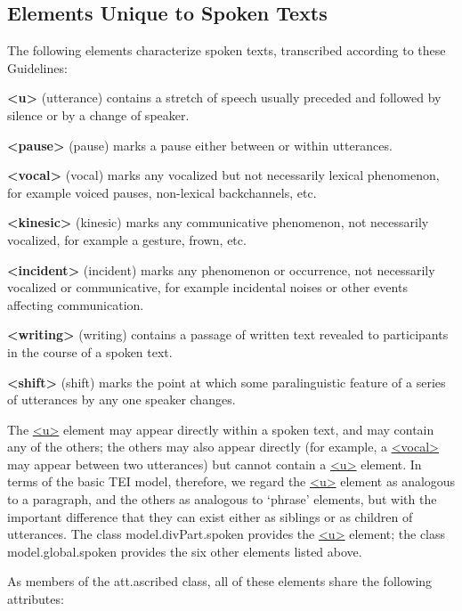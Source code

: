 \subsection[{Elements Unique to Spoken Texts}]{Elements Unique to Spoken Texts}\label{TSBA}\par
The following elements characterize spoken texts, transcribed according to these Guidelines: 
\begin{sansreflist}
  
\item [\textbf{<u>}] (utterance) contains a stretch of speech usually preceded and followed by silence or by a change of speaker.
\item [\textbf{<pause>}] (pause) marks a pause either between or within utterances.
\item [\textbf{<vocal>}] (vocal) marks any vocalized but not necessarily lexical phenomenon, for example voiced pauses, non-lexical backchannels, etc.
\item [\textbf{<kinesic>}] (kinesic) marks any communicative phenomenon, not necessarily vocalized, for example a gesture, frown, etc.
\item [\textbf{<incident>}] (incident) marks any phenomenon or occurrence, not necessarily vocalized or communicative, for example incidental noises or other events affecting communication.
\item [\textbf{<writing>}] (writing) contains a passage of written text revealed to participants in the course of a spoken text.
\item [\textbf{<shift>}] (shift) marks the point at which some paralinguistic feature of a series of utterances by any one speaker changes.
\end{sansreflist}
\par
The \hyperref[TEI.u]{<u>} element may appear directly within a spoken text, and may contain any of the others; the others may also appear directly (for example, a \hyperref[TEI.vocal]{<vocal>} may appear between two utterances) but cannot contain a \hyperref[TEI.u]{<u>} element. In terms of the basic TEI model, therefore, we regard the \hyperref[TEI.u]{<u>} element as analogous to a paragraph, and the others as analogous to ‘phrase’ elements, but with the important difference that they can exist either as siblings or as children of utterances. The class \textsf{model.divPart.spoken} provides the \hyperref[TEI.u]{<u>} element; the class \textsf{model.global.spoken} provides the six other elements listed above.\par
As members of the \textsf{att.ascribed} class, all of these elements share the following attributes: 
